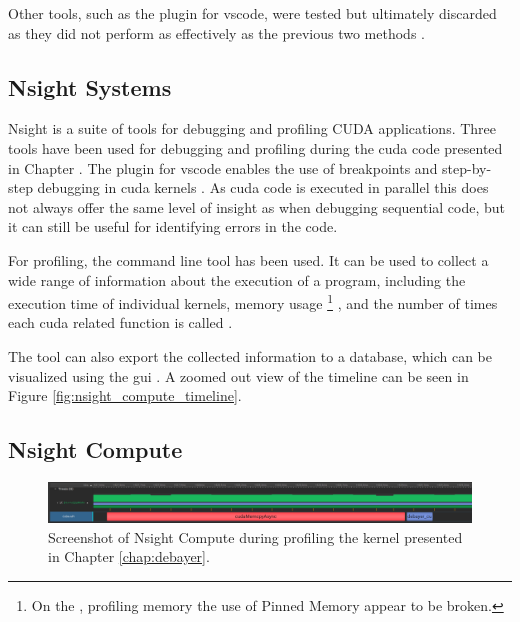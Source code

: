 Other tools, such as the  plugin for \gls{vscode}, were tested but ultimately discarded as they did not perform as effectively as the previous two methods \cite{tornettaAustinVSCode2023}.


\subsection{Nsight Systems}
Nsight is a suite of tools for debugging and profiling CUDA applications.
Three tools have been used for debugging and profiling during the \gls{cuda} code presented in Chapter \label{chap:debayer}.
The  plugin for \gls{vscode} enables the use of breakpoints and step-by-step debugging in \gls{cuda} kernels \cite{nvidiaNsightVisualStudio2021}.
As \gls{cuda} code is executed in parallel this does not always offer the same level of insight as when debugging sequential code, but it can still be useful for identifying errors in the code.

For profiling, the  command line tool has been used.
It can be used to collect a wide range of information about the execution of a program, including the execution time of individual kernels, memory usage
\footnote{On the \jx, profiling memory the use of Pinned Memory appear to be broken.}
, and the number of times each cuda related function is called \cite{nvidiaNVIDIANsightSystems2023}.

The  tool can also export the collected information to a  database, which can be visualized using the  \gls{gui} \cite{nvidiaNVIDIANsightSystems2023}.
A zoomed out view of the timeline can be seen in Figure \ref{fig:nsight_compute_timeline}.


\subsection{Nsight Compute}
\begin{figure}[H]
    \centering
    \includegraphics[width=\textwidth]{figures/memory_comparaison.png}
    \caption{Screenshot of Nsight Compute during profiling the kernel presented in Chapter \ref{chap:debayer}.}
    \label{fig:}
\end{figure}




